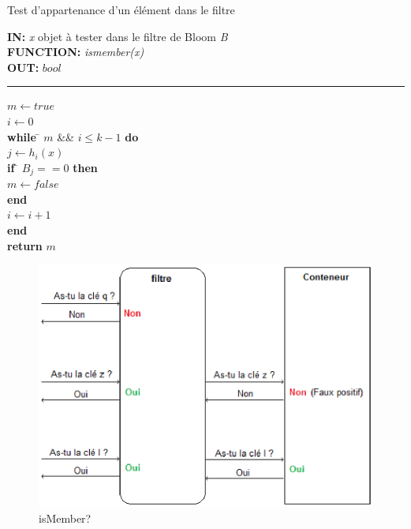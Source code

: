\newpage
\begin{algorithme}
	Test d'appartenance d'un élément dans le filtre
\end{algorithme}

\begin{flushleft}
	\begin{framed}
		\textbf{IN:} \emph{x} objet à tester dans le filtre de Bloom \textit{B}\\
		\textbf{FUNCTION:} \textit{ismember(x)}\\
		\textbf{OUT:} $bool$

		\noindent\rule{\linewidth}{0.5pt}

		\begin{tabbing}
			$m \leftarrow true$\\
			$i \leftarrow 0$\\
			\textbf{while} \= $m$ \&\& $i \leq k - 1$ \textbf{do}\\
					\> $j \leftarrow h_i(x)$\\
					\> \textbf{if} \= $B_j == 0$ \textbf{then}\\
					\> \> $m \leftarrow false$\\
					\> \textbf{end}\\
					\> $i \leftarrow i + 1$\\
			\textbf{end}\\
			\textbf{return} $m$\\
	    	\end{tabbing}		
	\end{framed}
\end{flushleft}

\begin{figure}[!htbp]
	\centering
	\includegraphics[width=12cm]{ismember.eps}
	\caption{isMember?}
\end{figure}	

	
	
	
	
	
	
	
	
	
	
	
	
	
	
	
	
	
	
	
	
	